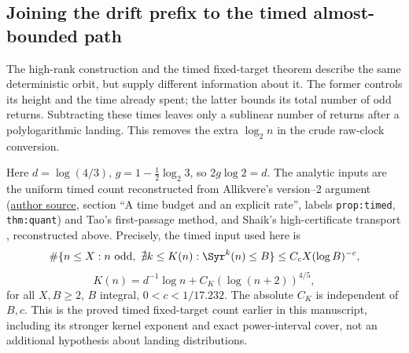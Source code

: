 \subsection{Joining the drift prefix to the timed almost-bounded path}
\label{subsec:Shaik-allikvere-splice}

The high-rank construction and the timed fixed-target theorem describe
the same deterministic orbit, but supply different information about it.
The former controls its height and the time already spent; the latter
bounds its total number of odd returns. Subtracting these times leaves
only a sublinear number of returns after a polylogarithmic landing.
This removes the extra \(\log_2 n\) in the crude raw-clock conversion.

Here \(d=\log(4/3)\), \(g=1-\tfrac12\log_2 3\), so \(2g\log2=d\).
The analytic inputs are the uniform timed count reconstructed from
Allikvere's version--2 argument
(\href{https://doi.org/10.5281/zenodo.21499244}{author source},
section ``A time budget and an explicit rate'', labels
\texttt{prop:timed}, \texttt{thm:quant}) and Tao's first-passage method, and Shaik's
high-certificate transport \cite{Shaik2026v324}, reconstructed above.
Precisely, the timed input used here is
\[
 \#\{n\le X:n\ {\rm odd},\
       \nexists k\le K(n):\Syr^k(n)\le B\}
 \le C_c X(\log B)^{-c},
\]
\[
 K(n)=d^{-1}\log n+C_K(\log(n+2))^{4/5},
\]
for all \(X,B\ge2\), \(B\) integral, \(0<c<1/17.232\).
The absolute \(C_K\) is independent of \(B,c\).
This is the proved timed fixed-target count earlier in this manuscript,
including its stronger kernel exponent and exact power-interval cover,
not an additional hypothesis about landing distributions.

